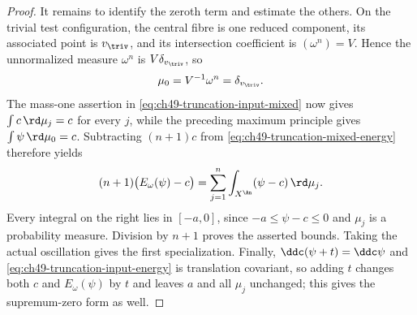 \begin{proof}
It remains to identify the zeroth term and estimate the others.  On the
trivial test configuration, the central fibre is one reduced component,
its associated point is $v_{\triv}$, and its intersection coefficient
is $(\omega^n)=V$.  Hence the unnormalized measure $\omega^n$ is
$V\delta_{v_{\triv}}$, so
\[
                         \mu_0=V^{-1}\omega^n=\delta_{v_{\triv}}.
\]
The mass-one assertion in \eqref{eq:ch49-truncation-input-mixed} now gives
$\int c\,\rd\mu_j=c$ for every $j$, while the preceding maximum
principle gives $\int\psi\,\rd\mu_0=c$.  Subtracting $(n+1)c$ from
\eqref{eq:ch49-truncation-mixed-energy} therefore yields
\[
 (n+1)\bigl(E_\omega(\psi)-c\bigr)
 =\sum_{j=1}^n\int_{X^{\An}}(\psi-c)\,\rd\mu_j.
\]
Every integral on the right lies in $[-a,0]$, since
$-a\le\psi-c\le0$ and $\mu_j$ is a probability measure.  Division
by $n+1$ proves the asserted bounds.  Taking the actual oscillation gives
the first specialization.  Finally, $\ddc(\psi+t)=\ddc\psi$ and
\eqref{eq:ch49-truncation-input-energy} is translation covariant, so
adding $t$ changes both $c$ and $E_\omega(\psi)$ by $t$ and
leaves $a$ and all $\mu_j$ unchanged; this gives the supremum-zero
form as well.
\end{proof}

